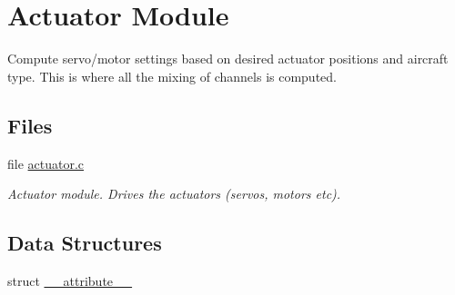 \hypertarget{group___actuator_module}{\section{Actuator Module}
\label{group___actuator_module}
}


Compute servo/motor settings based on desired actuator positions and aircraft type. This is where all the mixing of channels is computed.  


\subsection*{Files}
\begin{DoxyCompactItemize}
\item 
file \hyperlink{actuator_8c}{actuator.\-c}
\begin{DoxyCompactList}\small\item\em Actuator module. Drives the actuators (servos, motors etc). \end{DoxyCompactList}\end{DoxyCompactItemize}
\subsection*{Data Structures}
\begin{DoxyCompactItemize}
\item 
struct \hyperlink{struct____attribute____}{\-\_\-\-\_\-attribute\-\_\-\-\_\-}
\end{DoxyCompactItemize}
